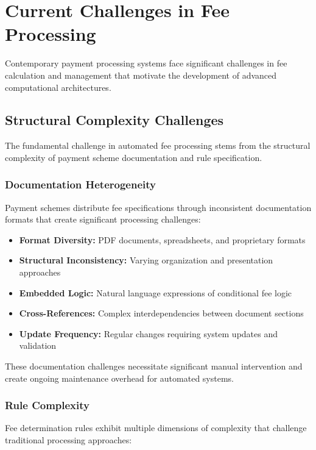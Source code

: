 \section{Current Challenges in Fee Processing}

Contemporary payment processing systems face significant challenges in fee calculation and management that motivate the development of advanced computational architectures.

\subsection{Structural Complexity Challenges}

The fundamental challenge in automated fee processing stems from the structural complexity of payment scheme documentation and rule specification.

\subsubsection{Documentation Heterogeneity}

Payment schemes distribute fee specifications through inconsistent documentation formats that create significant processing challenges:

\begin{itemize}
    \item \textbf{Format Diversity:} PDF documents, spreadsheets, and proprietary formats
    \item \textbf{Structural Inconsistency:} Varying organization and presentation approaches
    \item \textbf{Embedded Logic:} Natural language expressions of conditional fee logic
    \item \textbf{Cross-References:} Complex interdependencies between document sections
    \item \textbf{Update Frequency:} Regular changes requiring system updates and validation
\end{itemize}

These documentation challenges necessitate significant manual intervention and create ongoing maintenance overhead for automated systems.

\subsubsection{Rule Complexity}

Fee determination rules exhibit multiple dimensions of complexity that challenge traditional processing approaches:

